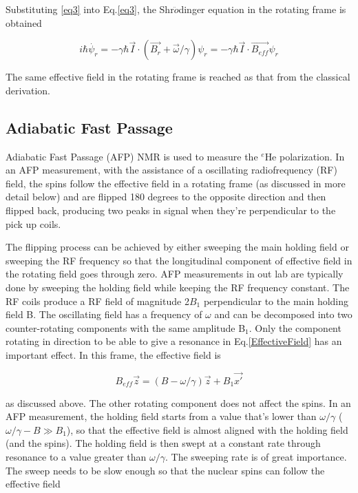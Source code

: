 Substituting \ref{eq3} into Eq.\ref{eq3}, the Shr$\ddot{o}$dinger equation in the rotating frame is obtained

\begin{equation}
i\hbar \dot{\psi_{r}}=-\gamma \hbar \vec{I}\cdot(\vec{B_{r}} + \vec{\omega}/\gamma)\psi_{r}=-\gamma \hbar \vec{I}\cdot\vec{B_{eff}}\psi_{r}
\end{equation}

The same effective field in the rotating frame is reached as that from the classical derivation.

\subsection{Adiabatic Fast Passage}

Adiabatic Fast Passage (AFP) NMR is used to measure the $^{e}$He polarization. In an AFP measurement, with the assistance of a oscillating radiofrequency (RF) field, the spins follow the effective field in a rotating frame (as discussed in more detail below) and are flipped 180 degrees to the opposite direction and then flipped back, producing two peaks in signal when they're perpendicular to the pick up coils.

The flipping process can be achieved by either sweeping the main holding field or sweeping the RF frequency so that the longitudinal component of effective field in the rotating field goes through zero. AFP measurements in out lab are typically done by sweeping the holding field while keeping the RF frequency constant. The RF coils produce a RF field of magnitude 2$B_{1}$ perpendicular to the main holding field B. The oscillating field has a frequency of $\omega$ and can be decomposed into two counter-rotating components with the same amplitude B$_{1}$. Only the component rotating in direction to be able to give a resonance in Eq.\ref{EffectiveField} has an important effect. In this frame, the effective field is

\begin{equation}
B_{eff}\vec{z}=(B-\omega/\gamma)\vec{z} + B_{1}\vec{x'}
\end{equation}

as discussed above. The other rotating component does not affect the spins. In an AFP measurement, the holding field starts from a value that's lower than $\omega/\gamma$ ($\omega/\gamma-B\gg B_{1}$), so that the effective field is almost aligned with the holding field (and the spins). The holding field is then swept at a constant rate through resonance to a value greater than $\omega/\gamma$. The sweeping rate is of great importance. The sweep needs to be slow enough so that the nuclear spins can follow the effective field

